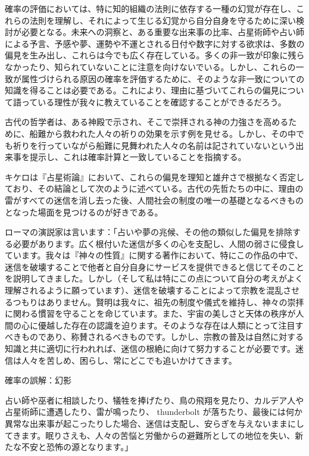 \documentclass[a4paper,11pt,openany]{ltjsbook}
\begin{document}
確率の評価においては、特に知的組織の法則に依存する一種の幻覚が存在し、これらの法則を理解し、それによって生じる幻覚から自分自身を守るために深い検討が必要となる。未来への洞察と、ある重要な出来事の比率、占星術師や占い師による予言、予感や夢、運勢や不運とされる日付や数字に対する欲求は、多数の偏見を生み出し、これらは今でも広く存在している。多くの非一致が印象に残らなかったり、知られていないことに注意を向けないでいる。しかし、これらの一致が属性づけられる原因の確率を評価するために、そのような非一致についての知識を得ることは必要である。これにより、理由に基づいてこれらの偏見について語っている理性が我々に教えていることを確認することができるだろう。

古代の哲学者は、ある神殿で示され、そこで崇拝される神の力強さを高めるために、船難から救われた人々の祈りの効果を示す例を見せる。しかし、その中でも祈りを行っていながら船難に見舞われた人々の名前は記されていないという出来事を提示し、これは確率計算と一致していることを指摘する。

キケロは『占星術論』において、これらの偏見を理知と雄弁さで根拠なく否定しており、その結論として次のように述べている。古代の先哲たちの中に、理由の雷がすべての迷信を消し去った後、人間社会の制度の唯一の基礎となるべきものとなった場面を見つけるのが好きである。

ローマの演説家は言います：「占いや夢の兆候、その他の類似した偏見を排除する必要があります。広く根付いた迷信が多くの心を支配し、人間の弱さに侵食しています。我々は『神々の性質』に関する著作において、特にこの作品の中で、迷信を破壊することで他者と自分自身にサービスを提供できると信じてそのことを説明してきました。しかし（そして私は特にこの点について自分の考えがよく理解されるように願っています）、迷信を破壊することによって宗教を混乱させるつもりはありません。賢明は我々に、祖先の制度や儀式を維持し、神々の崇拝に関わる慣習を守ることを命じています。また、宇宙の美しさと天体の秩序が人間の心に優越した存在の認識を迫ります。そのような存在は人類にとって注目すべきものであり、称賛されるべきものです。しかし、宗教の普及は自然に対する知識と共に適切に行われれば、迷信の根絶に向けて努力することが必要です。迷信は人々を苦しめ、困らし、常にどこでも追いかけてきます。

確率の誤解：幻影

占い師や巫者に相談したり、犠牲を捧げたり、鳥の飛翔を見たり、カルデア人や占星術師に遭遇したり、雷が鳴ったり、 thunderbolt が落ちたり、最後には何か異常な出来事が起こったりした場合、迷信は支配し、安らぎを与えないままにしてきます。眠りさえも、人々の苦悩と労働からの避難所としての地位を失い、新たな不安と恐怖の源となります。」
\end{document}
